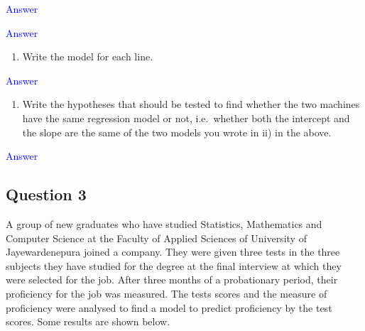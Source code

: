 \documentclass[]{article}
\providecommand{\tightlist}{%
  \setlength{\itemsep}{0pt}\setlength{\parskip}{0pt}}
\begin{document}
\textcolor{blue}{Answer}

\newpage

\textcolor{blue}{Answer}

\newpage

\begin{enumerate}
\def\labelenumi{\roman{enumi})}
\setcounter{enumi}{1}
\tightlist
\item
  Write the model for each line.
\end{enumerate}

\textcolor{blue}{Answer}

\newpage

\begin{enumerate}
\def\labelenumi{\roman{enumi})}
\setcounter{enumi}{2}
\tightlist
\item
  Write the hypotheses that should be tested to find whether the two
  machines have the same regression model or not, i.e.~whether both the
  intercept and the slope are the same of the two models you wrote in
  ii) in the above.
\end{enumerate}

\textcolor{blue}{Answer}

\newpage

\hypertarget{question-3}{%
\subsection{Question 3}\label{question-3}}

A group of new graduates who have studied Statistics, Mathematics and
Computer Science at the Faculty of Applied Sciences of University of
Jayewardenepura joined a company. They were given three tests in the
three subjects they have studied for the degree at the final interview
at which they were selected for the job. After three months of a
probationary period, their proficiency for the job was measured. The
tests scores and the measure of proficiency were analysed to find a
model to predict proficiency by the test scores. Some results are shown
below.
\end{document}
